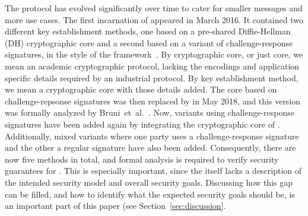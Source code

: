 \documentclass[runningheads, envcountsame, a4paper, draft, x11names]{llncs}
\newcommand{\spacehack}{\vspace{-1em}}
\begin{document}
The \mEdhoc{} protocol has evolved significantly over time to cater for smaller
messages and more use cases.
%
The first incarnation of \mEdhoc{} appeared in March 2016.
%
It contained two different key establishment methods, one based on a
pre-shared Diffie-Hellman (DH) cryptographic core and a second based on a
variant of challenge-response signatures, in the style of the \mNoise{}
framework~\cite{perrin2016noise}.
%
By cryptographic core, or just core, we mean an academic cryptographic protocol,
lacking the encodings and application specific details required by an industrial
protocol.
%
By key establishment method, we mean a cryptographic core with those details
added.
%
The core based on challenge-repsonse signatures was then replaced by \mSigma{}
in May 2018, and this version was formally analyzed by
Bruni~et~al.~\cite{DBLP:conf/secsr/BruniJPS18}.
%
Now, variants using challenge-response signatures have been added again by
integrating the cryptographic core of \mOptls{}.
%
Additionally, mixed variants where one party uses a challenge-response
signature and the other a regular signature have also been added.
%
Consequently, there are now five methods in total, and formal analysis is
required to verify security guarantees for \mEdhoc.
%
This is especially important, since the \mSpec{} itself lacks a description
of the intended security model and overall security goals.
%
Discussing how this gap can be filled, and how to identify what the expected
security goals should be, is an important part of this paper (see
Section~\ref{sec:discussion}.
%

\spacehack
\end{document}
